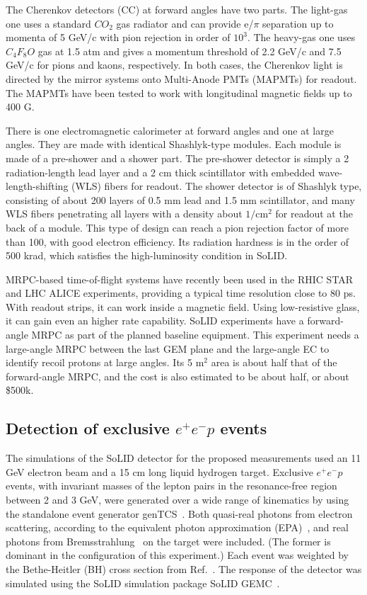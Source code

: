 The Cherenkov detectors (CC) at forward angles have two parts. The light-gas
one uses a standard $CO_2$ gas radiator and can provide e/$\pi$ separation up
to momenta of 5 GeV/c with pion rejection in order of $10^3$. The heavy-gas
one uses $C_4F_8O$ gas at 1.5 atm and gives a momentum threshold of 2.2 GeV/c
and 7.5 GeV/c for pions and kaons, respectively. In both cases, the Cherenkov
light is directed by the mirror systems onto Multi-Anode PMTs (MAPMTs) for
readout. The MAPMTs have been tested to work with longitudinal magnetic fields
up to 400 G.

There is one electromagnetic calorimeter at forward angles and one at large
angles. They are made with identical Shashlyk-type modules. Each module is
made of a pre-shower and a shower part. The pre-shower detector is simply a
2 radiation-length lead layer and a 2 cm thick scintillator with embedded
wave-length-shifting (WLS) fibers for readout. The shower detector is of
Shashlyk type, consisting of about 200 layers of 0.5 mm lead and 1.5 mm
scintillator, and many WLS fibers penetrating all layers with a density about
$1/$cm$^2$ for readout at the back of a module. This type of design can reach
a pion rejection factor of more than 100, with good electron efficiency. Its
radiation hardness is in the order of 500 krad, which satisfies the
high-luminosity condition in SoLID.

MRPC-based time-of-flight systems have recently been used in the RHIC STAR and
LHC ALICE experiments, providing a typical time resolution close to 80 ps.
With readout strips, it can work inside a magnetic field. Using low-resistive
glass, it can gain even an higher rate capability. SoLID experiments have a
forward-angle MRPC as part of the planned baseline equipment. This experiment
needs a large-angle MRPC between the last GEM plane and the large-angle EC to
identify recoil protons at large angles. Its 5 m$^2$ area is about half that
of the forward-angle MRPC, and the cost is also estimated to be about half,
or about \$500k.

\subsection{Detection of exclusive $e^+e^-p$ events}
\label{sec:tcs_selection}

The simulations of the SoLID detector for the proposed measurements used an 11
GeV electron beam and a 15 cm long liquid hydrogen target. Exclusive
$e^+e^-p$ events, with invariant masses of the lepton pairs in the
resonance-free region between 2 and 3 GeV, were generated over a wide range of
kinematics by using the standalone event generator genTCS~\cite{genTCS}. Both
quasi-real photons from electron scattering, according to the equivalent
photon approximation (EPA)~\cite{Kessler:1994}, and real photons from
Bremsstrahlung~\cite{PDG:2012} on the target were included. (The former is
dominant in the configuration of this experiment.) Each event was weighted by
the Bethe-Heitler (BH) cross section from Ref.~\cite{Berger:2001xd}. The
response of the detector was simulated using the SoLID simulation package
SoLID GEMC~\cite{SoLID_GEMC}.

